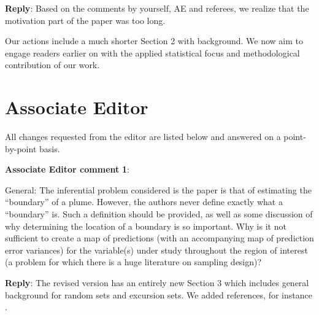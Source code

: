 \documentclass[a4paper]{article}
\newcounter{reviewer}
\def\aecom{\textbf{Associate Editor comment }}
\def\reply{\textbf{Reply}}
\begin{document}
\reply: Based on the comments by yourself, AE and referees, we realize that the motivation part of the paper was too long. 

Our actions include a much shorter Section 2 with background. We now aim to engage readers earlier on with the applied statistical focus and methodological contribution of our work. 



 \section*{Associate Editor}
All changes requested from the editor are listed below and answered on a point-by-point basis.

\setcounter{reviewer}{1}





\vspace{5mm}
\noindent \aecom \textbf{1}:

General: The inferential problem considered is the paper is that of estimating the “boundary” of a plume. However, the authors never define exactly what a “boundary” is. Such a definition should be provided, as well as some discussion of why determining the location of a boundary is so important. Why is it not sufficient to create a map of predictions (with an accompanying map of prediction error variances) for the variable(s) under study throughout the region of interest (a problem for which there is a huge literature on sampling design)?\par

\reply: The revised version has an entirely new Section 3 which includes general background for random sets and excursion sets. We added references, for instance \cite{adler2000excursion,Molchanov2005}.

\vspace{1em}
\end{document}
